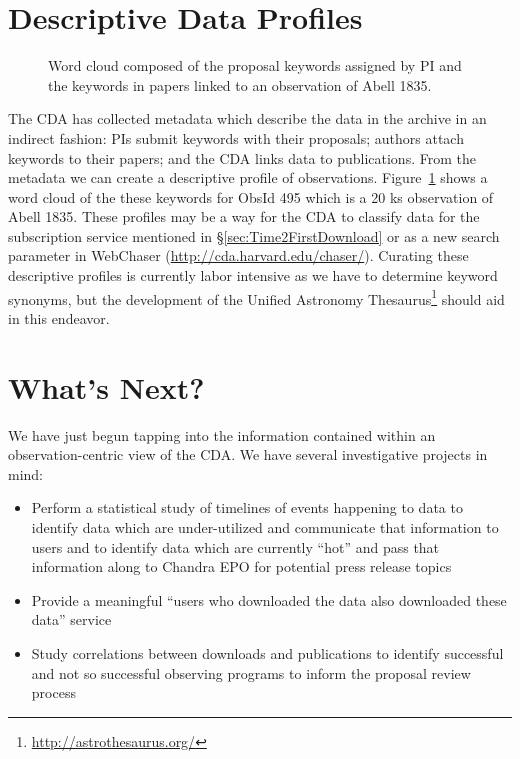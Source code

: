 \section{Descriptive Data Profiles}

\begin{figure}[ht]
\caption[WordCloud]
 { \label{fig:WordCloud}
Word cloud composed of the proposal keywords assigned by PI and the keywords in papers linked to an observation of Abell 1835.
 }
\end{figure}

The CDA has collected metadata which describe the data in the archive in an indirect fashion:  PIs submit keywords with their proposals; authors attach keywords to their papers; and the CDA links data to publications.  From the metadata we can create a descriptive profile of observations.  Figure~\ref{fig:WordCloud} shows a word cloud of the these keywords for ObsId 495 which is a 20 ks observation of Abell 1835.  These profiles may be a way for the CDA to classify data for the subscription service mentioned in \S\ref{sec:Time2FirstDownload} or as a new search parameter in WebChaser (\url{http://cda.harvard.edu/chaser/}).  Curating these descriptive profiles is currently labor intensive as we have to determine keyword synonyms, but the development of the Unified Astronomy Thesaurus\footnote{\url{http://astrothesaurus.org/}} should aid in this endeavor.

\section{What's Next?}
We have just begun tapping into the information contained within an observation-centric view of the CDA.  We have several investigative projects in mind:
\begin{itemize}
\item Perform a statistical study of timelines of events happening to data to identify data which are under-utilized and communicate that information to users and to identify data which are currently ``hot'' and pass that information along to Chandra EPO for potential press release topics
\item Provide a meaningful ``users who downloaded the data also downloaded these data'' service
\item Study correlations between downloads and publications to identify successful and not so successful observing programs to inform the proposal review process\end{itemize}

